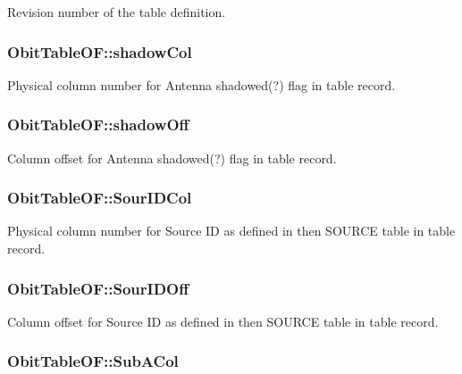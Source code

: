 Revision number of the table definition. 

\subsubsection{ {\bf Obit\-Table\-OF::shadow\-Col}}\label{structObitTableOF_o33}


Physical column number for Antenna shadowed(?) flag in table record. 

\subsubsection{ {\bf Obit\-Table\-OF::shadow\-Off}}\label{structObitTableOF_o32}


Column offset for Antenna shadowed(?) flag in table record. 

\subsubsection{ {\bf Obit\-Table\-OF::Sour\-IDCol}}\label{structObitTableOF_o23}


Physical column number for Source ID as defined in then SOURCE table in table record. 

\subsubsection{ {\bf Obit\-Table\-OF::Sour\-IDOff}}\label{structObitTableOF_o22}


Column offset for Source ID as defined in then SOURCE table in table record. 

\subsubsection{ {\bf Obit\-Table\-OF::Sub\-ACol}}\label{structObitTableOF_o27}


